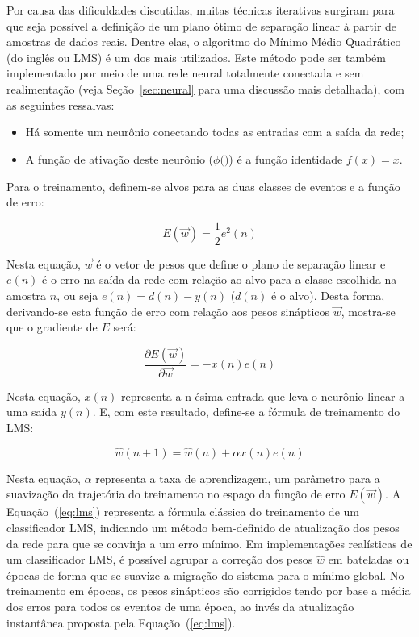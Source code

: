 Por causa das dificuldades discutidas, muitas técnicas iterativas surgiram
para que seja possível a definição de um plano ótimo de separação linear à
partir de amostras de dados reais. Dentre elas, o algoritmo do Mínimo Médio
Quadrático \cite{widrow} (do inglês  ou LMS) é um dos
mais utilizados. Este método pode ser também implementado por meio de uma rede
neural totalmente conectada e sem realimentação (veja Seção~\ref{sec:neural}
para uma discussão mais detalhada), com as seguintes ressalvas:

\begin{itemize}
\item Há somente um neurônio conectando todas as entradas com a saída da rede;
\item A função de ativação deste neurônio ($\phi(\dot)$) é a função identidade
$f(x) = x$.
\end{itemize}

Para o treinamento, definem-se alvos para as duas classes de eventos e a
função de erro:

\begin{equation}
E(\overrightarrow{w}) = \frac{1}{2} e^2(n)
\label{eq:mse-definition}
\end{equation}

Nesta equação, $\overrightarrow{w}$ é o vetor de pesos que define o plano de
separação linear e $e(n)$ é o erro na saída da rede com relação ao alvo para a
classe escolhida na amostra $n$, ou seja $e(n) = d(n)-y(n)$ ($d(n)$ é o
alvo). Desta forma, derivando-se esta função de erro com relação aos pesos
sinápticos $\overrightarrow{w}$, mostra-se que o gradiente de $E$ será:

\begin{equation}
\frac{\partial E(\overrightarrow{w})}{\partial \overrightarrow{w}} =
-x(n)e(n) 
\end{equation}

Nesta equação, $x(n)$ representa a n-ésima entrada que leva o neurônio linear
a uma saída $y(n)$. E, com este resultado, define-se a fórmula de treinamento
do LMS:

\begin{equation}
\hat{w}(n+1) = \hat{w}(n) + \alpha x(n)e(n)
\label{eq:lms}
\end{equation}

Nesta equação, $\alpha$ representa a taxa de aprendizagem, um parâmetro para a
suavização da trajetória do treinamento no espaço da função de erro
$E(\overrightarrow{w})$. A Equação~(\ref{eq:lms}) representa a fórmula
clássica do treinamento de um classificador LMS, indicando um método
bem-definido de atualização dos pesos da rede para que se convirja a um erro
mínimo. Em implementações realísticas de um classificador LMS, é possível
agrupar a correção dos pesos $\hat{w}$ em bateladas ou épocas de forma que se
suavize a migração do sistema para o mínimo global. No treinamento em épocas,
os pesos sinápticos são corrigidos tendo por base a média dos erros para todos
os eventos de uma época, ao invés da atualização instantânea proposta pela
Equação~(\ref{eq:lms}).

